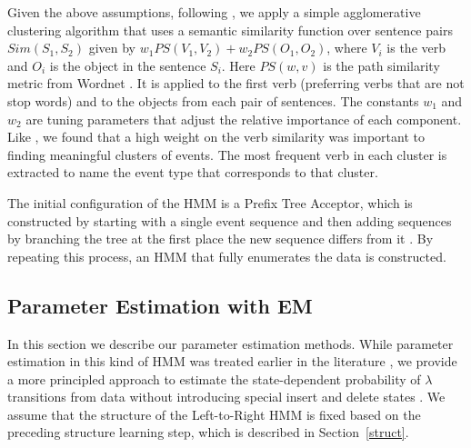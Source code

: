 \documentclass[letterpaper]{article}
\begin{document}
Given the above assumptions, following \cite{regneri2010learning}, we apply a simple agglomerative clustering algorithm that uses a semantic similarity function over sentence pairs  $Sim(S_1, S_2)$ given by $w_1 PS(V_1, V_2) + w_2 PS(O_1, O_2)$, where $V_i$ is the verb and $O_i$ is the object in the sentence $S_i$. Here $PS(w, v)$ is the path similarity metric from Wordnet \cite{miller1995wordnet}. It is applied to the first verb (preferring verbs that are not stop words) and to the objects from each pair of sentences.  The constants $w_1$ and $w_2$ are tuning parameters that adjust the relative importance of each component. Like \cite{regneri2010learning}, we found that a high weight on the verb similarity was important to finding meaningful clusters of events.  %
The most frequent verb in each cluster is extracted to name the event type that corresponds to that cluster.

The initial configuration of the HMM is a Prefix Tree Acceptor,
which is constructed by starting with a single event
sequence and then adding sequences by branching the tree
at the first place the new sequence differs from it
\cite{dupont1994search,seymore1999learning}.   %
By repeating this process, an HMM that fully enumerates the data is
constructed.  %



\subsection{Parameter Estimation with EM}
\label{em}

In this section we describe our parameter estimation methods.  While parameter estimation in this kind of HMM was treated earlier in the literature \cite{rabiner,bahl}, we provide a more principled approach to estimate the state-dependent probability of $\lambda$ transitions from data without introducing special insert and delete states \cite{profileHMMs}. We assume that the structure of the Left-to-Right HMM is fixed based on the preceding structure learning step, which is described in Section~\ref{struct}.
\end{document}
